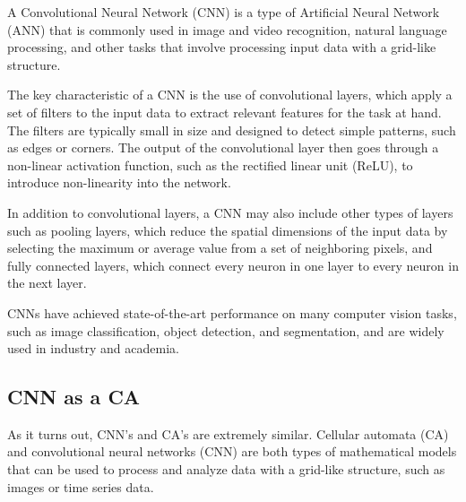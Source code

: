 A Convolutional Neural Network (CNN) is a type of Artificial Neural Network (ANN) that is commonly used in image and video recognition, natural language processing, and other tasks that involve processing input data with a grid-like structure.

The key characteristic of a CNN is the use of convolutional layers, which apply a set of filters to the input data to extract relevant features for the task at hand. The filters are typically small in size and designed to detect simple patterns, such as edges or corners. The output of the convolutional layer then goes through a non-linear activation function, such as the rectified linear unit (ReLU), to introduce non-linearity into the network.

In addition to convolutional layers, a CNN may also include other types of layers such as pooling layers, which reduce the spatial dimensions of the input data by selecting the maximum or average value from a set of neighboring pixels, and fully connected layers, which connect every neuron in one layer to every neuron in the next layer.

CNNs have achieved state-of-the-art performance on many computer vision tasks, such as image classification, object detection, and segmentation, and are widely used in industry and academia.

\subsection{CNN as a CA}
As it turns out, CNN's and CA's are extremely similar. Cellular automata (CA) and convolutional neural networks (CNN) are both types of mathematical models that can be used to process and analyze data with a grid-like structure, such as images or time series data. \cite{PhysRevE.100.032402}


